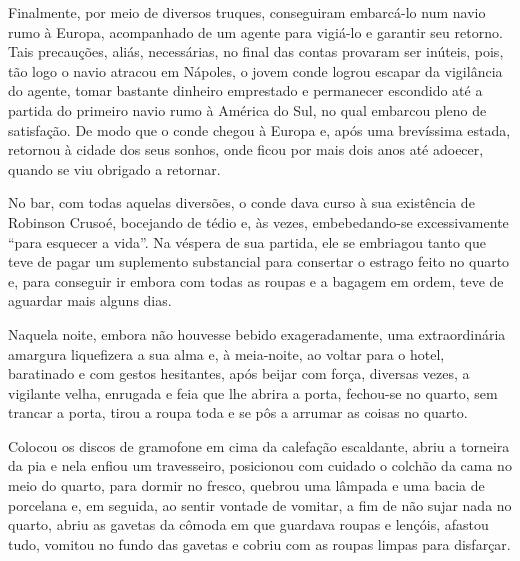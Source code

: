 Finalmente, por meio de diversos truques, conseguiram embarcá-lo num
navio rumo à Europa, acompanhado de um agente para vigiá-lo e garantir
seu retorno. Tais precauções, aliás, necessárias, no final das contas
provaram ser inúteis, pois, tão logo o navio atracou em Nápoles, o jovem
conde logrou escapar da vigilância do agente, tomar bastante dinheiro
emprestado e permanecer escondido até a partida do primeiro navio rumo à
América do Sul, no qual embarcou pleno de satisfação. De modo que o
conde chegou à Europa e, após uma brevíssima estada, retornou à cidade
dos seus sonhos, onde ficou por mais dois anos até adoecer, quando se
viu obrigado a retornar.


No bar, com todas aquelas diversões, o conde dava curso à sua existência
de Robinson Crusoé, bocejando de tédio e, às vezes, embebedando-se
excessivamente ``para esquecer a vida''. Na véspera de sua partida, ele
se embriagou tanto que teve de pagar um suplemento substancial para
consertar o estrago feito no quarto e, para conseguir ir embora com
todas as roupas e a bagagem em ordem, teve de aguardar mais alguns dias.

Naquela noite, embora não houvesse bebido exageradamente, uma
extraordinária amargura liquefizera a sua alma e, à meia-noite, ao
voltar para o hotel, baratinado e com gestos hesitantes, após beijar com
força, diversas vezes, a vigilante velha, enrugada e feia que lhe abrira
a porta, fechou-se no quarto, sem trancar a porta, tirou a roupa toda e
se pôs a arrumar as coisas no quarto.

Colocou os discos de gramofone em cima da calefação escaldante, abriu a
torneira da pia e nela enfiou um travesseiro, posicionou com cuidado o
colchão da cama no meio do quarto, para dormir no fresco, quebrou uma
lâmpada e uma bacia de porcelana e, em seguida, ao sentir vontade de
vomitar, a fim de não sujar nada no quarto, abriu as gavetas da cômoda
em que guardava roupas e lençóis, afastou tudo, vomitou no fundo das
gavetas e cobriu com as roupas limpas para disfarçar.

